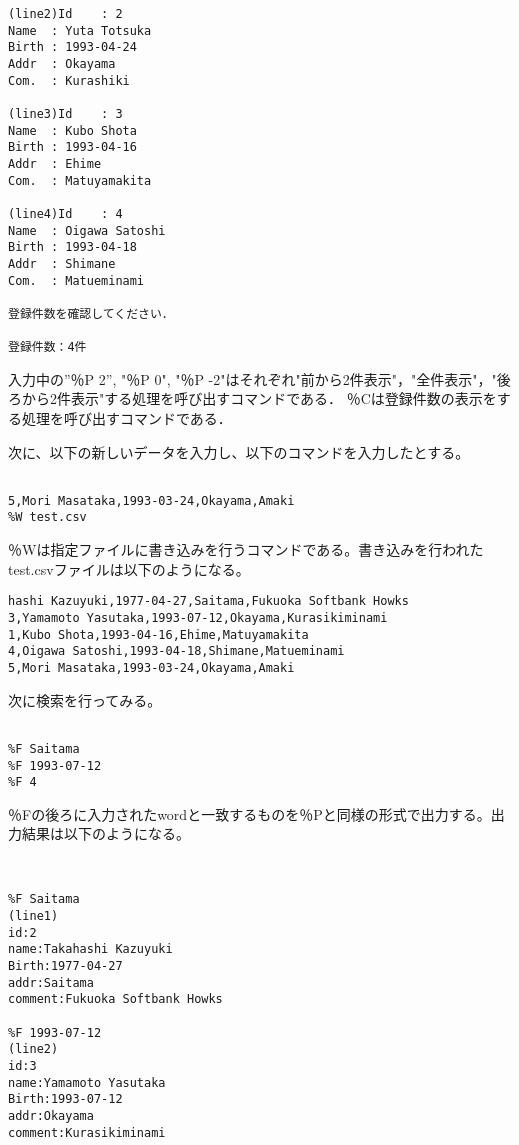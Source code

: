 \documentclass[a4j]{jarticle}
\begin{document}
\begin{enumerate}
{\begin{verbatim}
(line2)Id    : 2
Name  : Yuta Totsuka
Birth : 1993-04-24
Addr  : Okayama
Com.  : Kurashiki

(line3)Id    : 3
Name  : Kubo Shota
Birth : 1993-04-16
Addr  : Ehime
Com.  : Matuyamakita

(line4)Id    : 4
Name  : Oigawa Satoshi
Birth : 1993-04-18
Addr  : Shimane
Com.  : Matueminami

登録件数を確認してください．

登録件数：4件

\end{verbatim}
}

入力中の”％P 2”, "％P 0", "％P -2"はそれぞれ"前から2件表示"，"全件表示"，"後ろから2件表示"する処理を呼び出すコマンドである．
％Cは登録件数の表示をする処理を呼び出すコマンドである．

次に、以下の新しいデータを入力し、以下のコマンドを入力したとする。

{\baselineskip 3mm
\begin{verbatim}

5,Mori Masataka,1993-03-24,Okayama,Amaki
%W test.csv

\end{verbatim}
}

％Wは指定ファイルに書き込みを行うコマンドである。書き込みを行われたtest.csvファイルは以下のようになる。

{\baselineskip 3mm
\begin{verbatim}
hashi Kazuyuki,1977-04-27,Saitama,Fukuoka Softbank Howks
3,Yamamoto Yasutaka,1993-07-12,Okayama,Kurasikiminami
1,Kubo Shota,1993-04-16,Ehime,Matuyamakita
4,Oigawa Satoshi,1993-04-18,Shimane,Matueminami
5,Mori Masataka,1993-03-24,Okayama,Amaki
\end{verbatim}
}

次に検索を行ってみる。

{\baselineskip 3mm
\begin{verbatim}

%F Saitama
%F 1993-07-12
%F 4

\end{verbatim}
}

％Fの後ろに入力されたwordと一致するものを％Pと同様の形式で出力する。出力結果は以下のようになる。

{\baselineskip 3mm
\begin{verbatim}


%F Saitama
(line1)
id:2
name:Takahashi Kazuyuki
Birth:1977-04-27
addr:Saitama
comment:Fukuoka Softbank Howks

%F 1993-07-12
(line2)
id:3
name:Yamamoto Yasutaka
Birth:1993-07-12
addr:Okayama
comment:Kurasikiminami


\end{verbatim}}
\end{enumerate}
\end{document}
